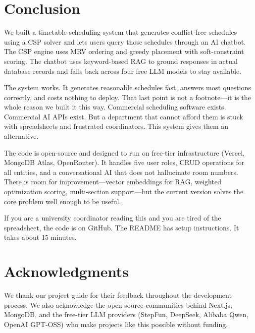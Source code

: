 \documentclass[conference]{IEEEtran}
\begin{document}
\section{Conclusion}

We built a timetable scheduling system that generates conflict-free schedules using a CSP solver and lets users query those schedules through an AI chatbot. The CSP engine uses MRV ordering and greedy placement with soft-constraint scoring. The chatbot uses keyword-based RAG to ground responses in actual database records and falls back across four free LLM models to stay available.

The system works. It generates reasonable schedules fast, answers most questions correctly, and costs nothing to deploy. That last point is not a footnote---it is the whole reason we built it this way. Commercial scheduling software exists. Commercial AI APIs exist. But a department that cannot afford them is stuck with spreadsheets and frustrated coordinators. This system gives them an alternative.

The code is open-source and designed to run on free-tier infrastructure (Vercel, MongoDB Atlas, OpenRouter). It handles five user roles, CRUD operations for all entities, and a conversational AI that does not hallucinate room numbers. There is room for improvement---vector embeddings for RAG, weighted optimization scoring, multi-section support---but the current version solves the core problem well enough to be useful.

If you are a university coordinator reading this and you are tired of the spreadsheet, the code is on GitHub. The README has setup instructions. It takes about 15 minutes.

\section*{Acknowledgments}

We thank our project guide for their feedback throughout the development process. We also acknowledge the open-source communities behind Next.js, MongoDB, and the free-tier LLM providers (StepFun, DeepSeek, Alibaba Qwen, OpenAI GPT-OSS) who make projects like this possible without funding.
\end{document}
